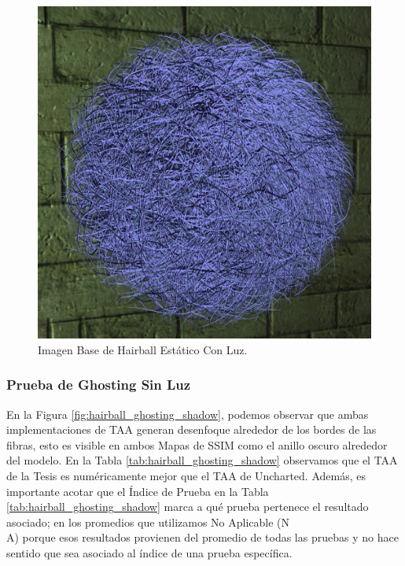 \documentclass[pregrado]{tesis-usb} %
\begin{document}
\begin{figure}[!htb]
	\centering
	\includegraphics[scale=0.2]{images/results/hairball_light_sobel_ground_truth.png}
	\caption{Imagen Base de Hairball Estático Con Luz.}\label{fig:hairball_static_lighted_truth}
\end{figure}

\FloatBarrier

\subsubsection{Prueba de Ghosting Sin Luz}
En la Figura \ref{fig:hairball_ghosting_shadow}, podemos observar que ambas implementaciones de TAA generan desenfoque alrededor de los bordes de las fibras, esto es visible en ambos Mapas de SSIM como el anillo oscuro alrededor del modelo. En la Tabla \ref{tab:hairball_ghosting_shadow} observamos que el TAA de la Tesis es numéricamente mejor que el TAA de Uncharted. Además, es importante acotar que el Índice de Prueba en la Tabla \ref{tab:hairball_ghosting_shadow} marca a qué prueba pertenece el resultado asociado; en los promedios que utilizamos No Aplicable (N \\ A) porque esos resultados provienen del promedio de todas las pruebas y no hace sentido que sea asociado al índice de una prueba específica. 
\end{document}

